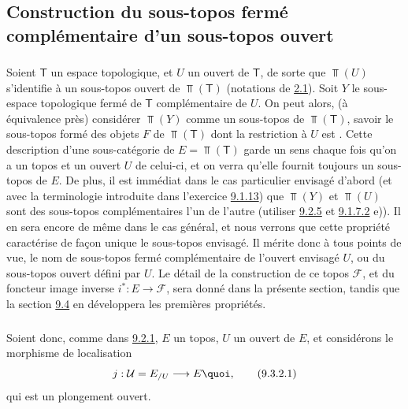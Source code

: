 \documentclass[10pt]{../fichiers-configuration-latex/smfart}
\begin{document}
\subsection{Construction du sous-topos fermé complémentaire d'un
sous-topos ouvert}\pageoriginale

\subsubsection{}
Soient $\mathsf{T}$ un espace topologique, et $U$ un ouvert de
$\mathsf{T}$, de sorte que $\Top(U)$ s'identifie à un sous-topos
ouvert de $\Top(\mathsf{T})$ (notations de \hyperref[IV.subsec2.1]{2.1}). Soit
$Y$ le sous-espace topologique fermé de $\mathsf{T}$ complémentaire
de $U$. On peut alors, (à équivalence près) considérer $\Top(Y)$
comme un sous-topos de $\Top(\mathsf{T})$, savoir le sous-topos
formé des objets $F$ de $\Top(\mathsf{T})$ dont la restriction à $U$
est . Cette description d'une sous-catégorie de
$E=\Top(\mathsf{T})$ garde un sens chaque fois qu'on a un topos et
un ouvert $U$ de celui-ci, et on verra qu'elle fournit toujours un
sous-topos de $E$. De plus, il est immédiat dans le cas particulier
envisagé d'abord (et avec la terminologie introduite dans l'exercice
\hyperref[IV.exer9.1.13]{9.1.13}) que $\Top(Y)$ et $\Top(U)$ sont des sous-topos
complémentaires l'un de l'autre (utiliser \hyperref[IV.subsubsec9.2.5]{9.2.5} et
\hyperref[IV.exer9.1.7.2]{9.1.7.2} e)). Il en sera encore de même dans le cas
général, et nous verrons que cette propriété caractérise de façon
unique le sous-topos envisagé. Il mérite donc à tous points de vue,
le nom de sous-topos fermé complémentaire de l'ouvert envisagé $U$,
ou du sous-topos ouvert défini par $U$. Le détail de la construction
de ce topos $\mathcal{F}$, et du foncteur image inverse
$i^{\ast}:E\rightarrow \mathcal{F}$, sera donné dans la présente
section, tandis que la section \hyperref[IV.subsec9.4]{9.4} en développera les
premières propriétés.

\subsubsection{}
Soient donc, comme dans \hyperref[IV.subsubsec9.2.1]{9.2.1}, $E$ un topos, $U$ un
ouvert de $E$, et considérons le morphisme de localisation
\begin{equation*}
j:\mathcal{U}=E_{/U}\longrightarrow E{\quoi},\tag{9.3.2.1}
\end{equation*}
qui est un plongement ouvert.
\end{document}
